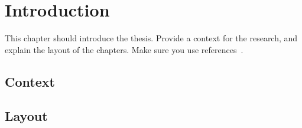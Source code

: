 \chapter{Introduction}
This chapter should introduce the thesis.
Provide a context for the research, and explain the layout of the chapters.
Make sure you use references~\cite{einstein}.

\section{Context}

\lipsum[1-4]

\section{Layout}

\lipsum[1-4]